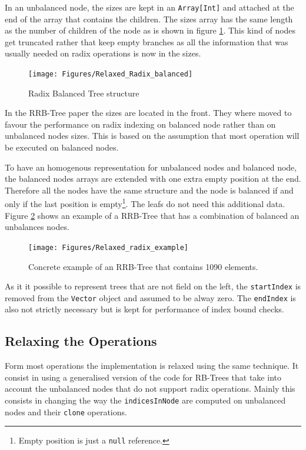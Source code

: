 In an unbalanced node, the sizes are kept in an \texttt{Array[Int]} and attached at the end of the array that contains the children. The sizes array has the same length as the number of children of the node as is shown in figure \ref{Relaxed_Radix_balanced}. This kind of nodes get truncated rather that keep empty branches as all the information that was usually needed on radix operations is now in the sizes.

\begin{figure}[h!]
  \centering
  \texttt{[image: Figures/Relaxed\_Radix\_balanced]}
  \caption{Radix Balanced Tree structure}
  \label{Relaxed_Radix_balanced}
\end{figure}

In the RRB-Tree paper \cite{RRBTrees} the sizes are located in the front. They where moved to favour the performance on radix indexing on balanced node rather than on unbalanced nodes sizes. This is based on the assumption that most operation will be executed on balanced nodes.

To have an homogenous representation for unbalanced nodes and balanced node, the balanced nodes arrays are extended with one extra empty position at the end. Therefore all the nodes have the same structure and the node is balanced if and only if the last position is empty\footnote{Empty position is just a \texttt{null} reference.}. The leafs do not need this additional data. Figure \ref{Relaxed_radix_example} shows an example of a RRB-Tree that has a combination of balanced an unbalances nodes.

\begin{figure}[h!]
  \centering
  \texttt{[image: Figures/Relaxed\_radix\_example]}
  \caption{Concrete example of an RRB-Tree that contains 1090 elements.}
  \label{Relaxed_radix_example}
\end{figure}

As it it possible to represent trees that are not field on the left, the \texttt{startIndex} is removed from the \texttt{Vector} object and assumed to be alway zero. The \texttt{endIndex} is also not strictly necessary but is kept for performance of index bound checks.

\subsection{Relaxing the Operations}
Form most operations the implementation is relaxed using the same technique. It consist in using a generalised version of the code for RB-Trees that take into account the unbalanced nodes that do not support radix operations. Mainly this consists in changing the way the \texttt{indicesInNode} are computed on unbalanced nodes and their \texttt{clone} operations.
 
